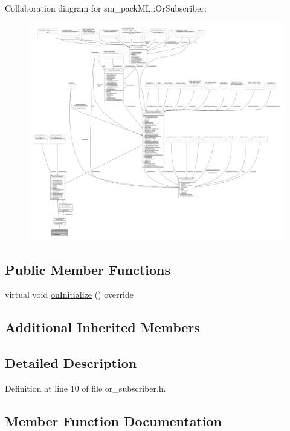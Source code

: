 Collaboration diagram for sm\+\_\+pack\+ML\+:\+:Or\+Subscriber\+:
\nopagebreak
\begin{figure}[H]
\begin{center}
\leavevmode
\includegraphics[width=350pt]{classsm__packML_1_1OrSubscriber__coll__graph}
\end{center}
\end{figure}
\subsection*{Public Member Functions}
\begin{DoxyCompactItemize}
\item 
virtual void \hyperlink{classsm__packML_1_1OrSubscriber_acdcffc7bb365710f8ab3a0f4aa0a8269}{on\+Initialize} () override
\end{DoxyCompactItemize}
\subsection*{Additional Inherited Members}


\subsection{Detailed Description}


Definition at line 10 of file or\+\_\+subscriber.\+h.



\subsection{Member Function Documentation}
